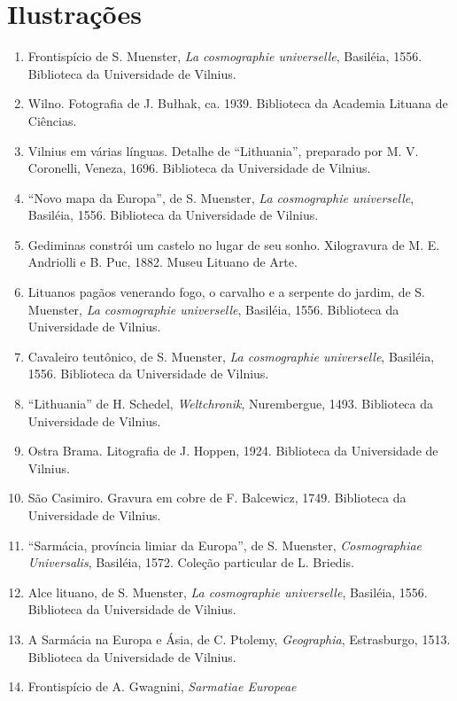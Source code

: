 \chapter{Ilustrações}

\begin{enumerate}
\def\labelenumi{\arabic{enumi}.}
\item
  Frontispício de S. Muenster, \emph{La cosmographie universelle},
  Basiléia, 1556. Biblioteca da Universidade de Vilnius.
\item
  Wilno. Fotografia de J. Bułhak, ca. 1939. Biblioteca da Academia
  Lituana de Ciências.
\item
  Vilnius em várias línguas. Detalhe de ``Lithuania'', preparado por M.
  V. Coronelli, Veneza, 1696. Biblioteca da Universidade de Vilnius.
\item
  ``Novo mapa da Europa'', de S. Muenster, \emph{La cosmographie
  universelle}, Basiléia, 1556. Biblioteca da Universidade de Vilnius.
\item
  Gediminas constrói um castelo no lugar de seu sonho. Xilogravura de M.
  E. Andriolli e B. Puc, 1882. Museu Lituano de Arte.
\item
  Lituanos pagãos venerando fogo, o carvalho e a serpente do jardim, de
  S. Muenster, \emph{La cosmographie universelle}, Basiléia, 1556.
  Biblioteca da Universidade de Vilnius.
\item
  Cavaleiro teutônico, de S. Muenster, \emph{La cosmographie
  universelle}, Basiléia, 1556. Biblioteca da Universidade de Vilnius.
\item
  ``Lithuania'' de H. Schedel, \emph{Weltchronik}, Nurembergue, 1493.
  Biblioteca da Universidade de Vilnius.
\item
  Ostra Brama. Litografia de J. Hoppen, 1924. Biblioteca da Universidade
  de Vilnius.
\item
  São Casimiro. Gravura em cobre de F. Balcewicz, 1749. Biblioteca da
  Universidade de Vilnius.
\item
  ``Sarmácia, província limiar da Europa'', de S. Muenster,
  \emph{Cosmographiae Universalis}, Basiléia, 1572. Coleção particular
  de L. Briedis.
\item
  Alce lituano, de S. Muenster, \emph{La cosmographie universelle},
  Basiléia, 1556. Biblioteca da Universidade de Vilnius.
\item
  A Sarmácia na Europa e Ásia, de C. Ptolemy, \emph{Geographia},
  Estrasburgo, 1513. Biblioteca da Universidade de Vilnius.
\item
  Frontispício de A. Gwagnini, \emph{Sarmatiae Europeae
}
\end{enumerate}
